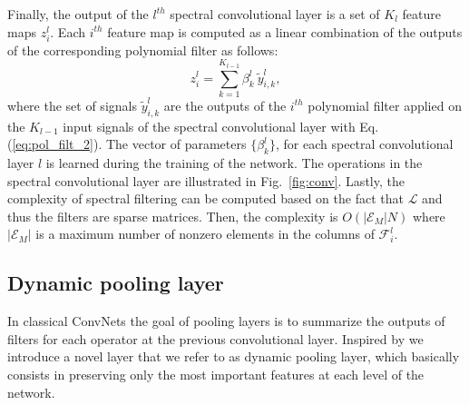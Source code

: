 \documentclass[10pt,journal,compsoc]{IEEEtran}
\begin{document}
	
	
	Finally, the output of the $l^{th}$ spectral convolutional layer is a set of $K_{l}$ feature maps $z_i^{l}$. Each $i^{th}$ feature map is computed as a linear combination of the outputs of the corresponding polynomial filter as follows: %
	\begin{equation}
	z_i^{l} =  \sum_{k=1}^{K_{l-1}} \beta_{k}^{l} \ \tilde{y}_{i,k}^{l} , 
	\label{eq:lincomb}
	\end{equation}
	\noindent
	where the set of signals $\tilde{y}_{i,k}^{l}$ are the outputs of the $i^{th}$ polynomial filter applied on the $K_{l-1}$ input signals of the spectral convolutional layer with Eq. (\ref{eq:pol_filt_2}). The vector of parameters $\{\beta_{k}^{l}\}$, for each spectral convolutional layer $l$ is learned during the training of the network. The operations in the spectral convolutional layer are illustrated in Fig.~\ref{fig:conv}. Lastly, the complexity of spectral filtering can be computed based on the fact that $\mathcal{L}$ and thus the filters are sparse matrices. Then, the complexity is $O(|\mathcal{E}_M | N)$ where $|\mathcal{E}_M|$ is a maximum number of nonzero elements in the columns of $\mathcal{F}_i^{l}$.
	
	
	\subsection{Dynamic pooling layer}
	\label{s:pool}
	
	In classical ConvNets the goal of pooling layers is to summarize the outputs of filters for each operator at the previous convolutional layer. Inspired by \cite{bb:dmaxpool} we introduce a novel layer that we refer to as dynamic pooling layer, which basically consists in preserving only the most important features at each level of the network.
	
\end{document}

